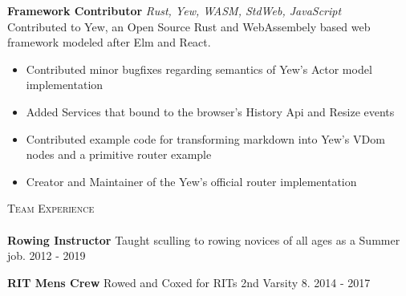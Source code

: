 \documentclass[a4paper]{article}
\newcommand{\lineunder} {
    \vspace*{-8pt} \\
    \hspace*{-18pt} \hrulefill \\
}
\newcommand{\header} [1] {
    {\hspace*{-18pt}\vspace*{6pt} \textsc{#1}}
    \vspace*{-6pt} \lineunder
}
\begin{document}
\begin{addmargin}[1em]{2em}%
{\textbf{Framework Contributor}} {\sl Rust, Yew, WASM, StdWeb, JavaScript} \\
Contributed to Yew, an Open Source Rust and WebAssembely based web framework modeled after Elm and React.
\vspace*{-2mm}
\begin{itemize}[leftmargin=4.5mm] \itemsep -1mm
	\item Contributed minor bugfixes regarding semantics of Yew's Actor model implementation
	\item Added Services that bound to the browser's History Api and Resize events
    \item Contributed example code for transforming markdown into Yew's VDom nodes and a primitive router example
    \item Creator and Maintainer of the Yew's official router implementation
\end{itemize}
\vspace*{2mm}
\end{addmargin}


\header{Team Experience}
\textbf{Rowing Instructor}
Taught sculling to rowing novices of all ages as a Summer job. \hfill 2012 - 2019\\
\vspace*{2mm}

\textbf{RIT Men\textquotesingle{}s Crew}
Rowed and Coxed for RIT\textquotesingle{}s 2nd Varsity 8. \hfill  2014 - 2017\\
\vspace*{2mm}
\end{document}
